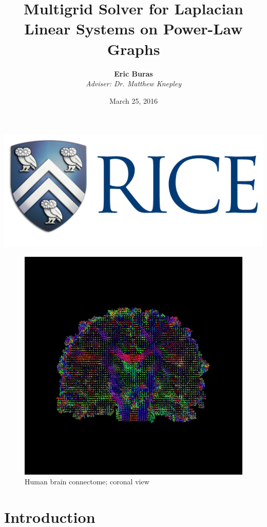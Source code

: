 \documentclass[xcolor=dvipsnames,10pt]{beamer}
\title[Rice University]  {Multigrid Solver for Laplacian Linear Systems on Power-Law Graphs}
\author[Buras]{\Large\textbf{Eric Buras}\\
\vspace{.15in}
\textit{\normalsize Adviser: Dr. Matthew Knepley}}
\date{March 25, 2016}
\institute[]{Rice University \\ Department of Computational and Applied Mathematics}
\begin{document}
 
\begin{frame}
  \titlepage
  \begin{center}
\includegraphics[width=.3\linewidth]{rice.png}
\end{center}
\end{frame}

\begin{frame}
\begin{figure}
\includegraphics[width=.65\linewidth]{HumanConnectome.png}
\caption{Human brain connectome; coronal view \cite{Toga:2012}}
\end{figure}
\end{frame}






\section{Introduction}
\end{document}
